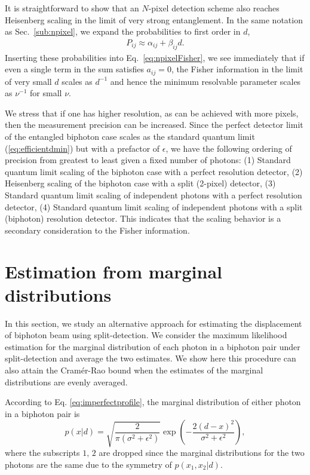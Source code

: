 It is straightforward to show that an $N$-pixel detection scheme also reaches Heisenberg scaling in the limit of very strong entanglement.  
In the same notation as Sec.~\ref{sub:npixel}, we expand the probabilities to first order in $d$,
\begin{align}
P_{ij} \approx \alpha_{ij} + \beta_{ij} d.
\end{align}
Inserting these probabilities into Eq.~\eqref{eq:npixelFisher}, we see immediately that if even a single term in the sum satisfies $a_{ij} = 0$, the Fisher information in the limit of very small $d$ scales as $d^{-1}$ and hence the minimum resolvable parameter scales as $\nu^{-1}$ for small $\nu$.

We stress that if one has higher resolution, as can be achieved with more pixels, then the measurement precision can be increased.  Since the perfect detector limit of the entangled biphoton case scales as the standard quantum limit (\ref{eq:efficientdmin}) but with a prefactor of $\epsilon$, we have the following ordering of precision from greatest to least given a fixed number of photons: (1) Standard quantum limit scaling of the biphoton case with a perfect resolution detector, (2) Heisenberg scaling of the biphoton case with a split (2-pixel) detector, (3)  Standard quantum limit scaling of independent photons with a perfect resolution detector, (4)  Standard quantum limit scaling of independent photons with a split (biphoton) resolution detector.  This indicates that the scaling behavior is a secondary consideration to the Fisher information. 

\section{Estimation from marginal distributions}\label{sec:marginal}

In this section, we study an alternative approach for estimating the  displacement of biphoton beam using split-detection. We consider the maximum likelihood estimation for the marginal distribution of each photon in a biphoton pair under split-detection and average the two estimates. We show here this procedure can also attain the Cram\'er-Rao bound when the estimates of the marginal distributions are evenly averaged.

According to Eq. \eqref{eq:imperfectprofile}, the marginal distribution of either photon in a biphoton pair is
\begin{equation}
p(x|d)=\sqrt{\frac{2}{\pi(\sigma^{2}+\epsilon^{2})}}\exp\left(-\frac{2(d-x)^{2}}{\sigma^{2}+\epsilon^{2}}\right),\label{eq:marginal distribution}
\end{equation}
where the subscripts $1,\,2$ are dropped since the marginal distributions
for the two photons are the same due to the symmetry of $p(x_{1},x_{2}|d)$.

